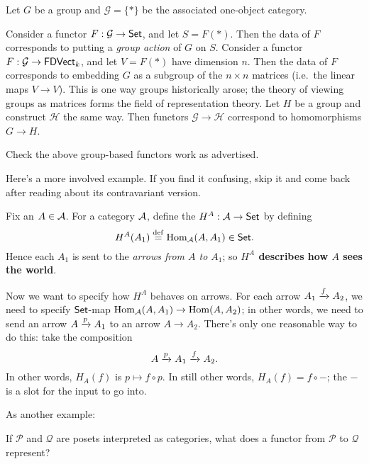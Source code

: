 \begin{example}
	Let $G$ be a group and $\mathcal G = \{\ast\}$ be the associated one-object category.
	\begin{enumerate}[(a)]
		\ii Consider a functor $F : \mathcal G \to \catname{Set}$, and let $S = F(\ast)$.
		Then the data of $F$ corresponds to putting a \emph{group action} of $G$ on $S$.
		\ii Consider a functor $F : \mathcal G \to \catname{FDVect}_k$, and let $V = F(\ast)$ have dimension $n$.
		Then the data of $F$ corresponds to embedding $G$ as a subgroup of the $n \times n$ matrices
		(i.e.\ the linear maps $V \to V$).
		This is one way groups historically arose; the theory of viewing groups as matrices
		forms the field of representation theory.
		\ii Let $H$ be a group and construct $\mathcal H$ the same way.
		Then functors $\mathcal G \to \mathcal H$ correspond to homomorphisms $G \to H$.
	\end{enumerate}
\end{example}
\begin{exercise}
	Check the above group-based functors work as advertised.
\end{exercise}

Here's a more involved example.
If you find it confusing,
skip it and come back after reading about its contravariant version.
\begin{example}
	\label{ex:covariant_yoneda}
	Fix an $A \in \AA$.
	For a category $\AA$, define the
	 $H^A : \AA \to \catname{Set}$
	by defining \[ H^A(A_1) \defeq \Hom_\AA (A, A_1) \in \catname{Set}. \]
	Hence each $A_1$ is sent to the \emph{arrows from $A$ to $A_1$};
	so \textbf{$H^A$ describes how $A$ sees the world}.

	Now we want to specify how $H^A$ behaves on arrows.
	For each arrow $A_1 \taking{f} A_2$, we need
	to specify $\catname{Set}$-map $\Hom_\AA (A, A_1) \to \Hom(A, A_2)$;
	in other words, we need to send an arrow $A \taking{p} A_1$ to an arrow $A \to A_2$.
	There's only one reasonable way to do this: take the composition
	\[ A \taking{p} A_1 \taking{f} A_2. \]
	In other words, $H_A(f)$ is $p \mapsto f \circ p$.
	In still other words, $H_A(f) = f \circ -$;
	the $-$ is a slot for the input to go into.
\end{example}

As another example:
\begin{ques}
	If $\mathcal P$ and $\mathcal Q$ are posets interpreted as categories,
	what does a functor from $\mathcal P$ to $\mathcal Q$ represent?
\end{ques}

